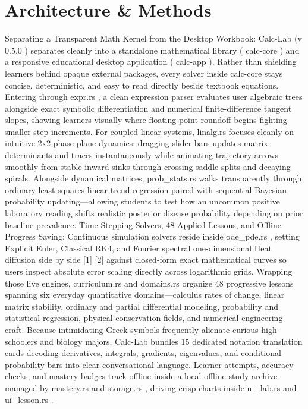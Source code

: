 \documentclass[10pt,letterpaper]{article}
\begin{document}
\section{Architecture \& Methods}
Separating a Transparent Math Kernel from the Desktop Workbook: Calc-Lab (v 0.5.0 ) separates cleanly into a standalone mathematical library ( calc-core ) and a responsive educational desktop application ( calc-app ). Rather than shielding learners behind opaque external packages, every solver inside calc-core stays concise, deterministic, and easy to read directly beside textbook equations. Entering through expr.rs , a clean expression parser evaluates user algebraic trees alongside exact symbolic differentiation and numerical finite-difference tangent slopes, showing learners visually where floating-point roundoff begins fighting smaller step increments. For coupled linear systems, linalg.rs focuses cleanly on intuitive 2x2 phase-plane dynamics: dragging slider bars updates matrix determinants and traces instantaneously while animating trajectory arrows smoothly from stable inward sinks through crossing saddle splits and decaying spirals. Alongside dynamical matrices, prob\_stats.rs walks transparently through ordinary least squares linear trend regression paired with sequential Bayesian probability updating---allowing students to test how an uncommon positive laboratory reading shifts realistic posterior disease probability depending on prior baseline prevalence. Time-Stepping Solvers, 48 Applied Lessons, and Offline Progress Saving: Continuous simulation solvers reside inside ode\_pde.rs , setting Explicit Euler, Classical RK4, and Fourier spectral one-dimensional Heat diffusion side by side [1] [2] against closed-form exact mathematical curves so users inspect absolute error scaling directly across logarithmic grids. Wrapping those live engines, curriculum.rs and domains.rs organize 48 progressive lessons spanning six everyday quantitative domains---calculus rates of change, linear matrix stability, ordinary and partial differential modeling, probability and statistical regression, physical conservation fields, and numerical engineering craft. Because intimidating Greek symbols frequently alienate curious high-schoolers and biology majors, Calc-Lab bundles 15 dedicated notation translation cards decoding derivatives, integrals, gradients, eigenvalues, and conditional probability bars into clear conversational language. Learner attempts, accuracy checks, and mastery badges track offline inside a local offline study archive managed by mastery.rs and storage.rs , driving crisp charts inside ui\_lab.rs and ui\_lesson.rs .
\end{document}
